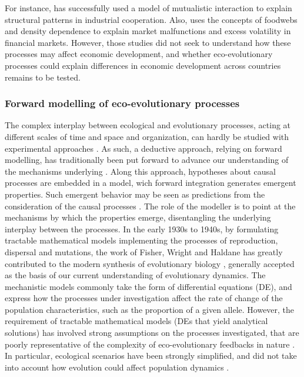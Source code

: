 % 
For instance, \cite{Saavedra2009a} has successfully used a model of mutualistic interaction to explain structural patterns in industrial cooperation.
% 
Also, \cite{Scholl2020} uses the concepts of foodwebs and density dependence to explain market malfunctions and excess volatility in financial markets.
% 
However, those studies did not seek to understand how these processes may affect economic development, and whether eco-evolutionary processes could explain differences in economic development across countries remains to be tested.

\subsubsection*{Forward modelling of eco-evolutionary processes}
The complex interplay between ecological and evolutionary processes, acting at different scales of time and space and organization, can hardly be studied with experimental approaches \cite{Pontarp2019,Hagen2022}. 
As such, a deductive approach, relying on forward modelling, has traditionally been put forward to advance our understanding of the mechanisms underlying \cite{Brummitt2020}. Along this approach, hypotheses about causal processes are embedded in a model, wich forward integration generates emergent properties. Such emergent behavior may be seen as predictions from the consideration of the causal processes \cite{May2004}. The role of the modeller is to point at the mechanisms by which the properties emerge, disentangling the underlying interplay between the processes. %
% 
In the early 1930s to 1940s, by formulating tractable mathematical models implementing the processes of reproduction, dispersal and mutations, the work of Fisher, Wright and Haldane has greatly contributed to the modern synthesis of evolutionary biology \cite{huxley1942evolution}, generally accepted as the basis of our current understanding of evolutionary dynamics. 
% 
The mechanistic models commonly take the form of differential equations (DE), and express how the processes under investigation affect the rate of change of the population characteristics, such as the proportion of a given allele. 
% 
However, the requirement of tractable mathematical models (DEs that yield analytical solutions) has involved strong assumptions on the processes investigated, that are poorly representative of the complexity of eco-evolutionary feedbacks in nature \cite{Govaert2019a}. In particular, ecological scenarios have been strongly simplified, and did not take into account how evolution could affect population dynamics \cite{Lion2022}.

